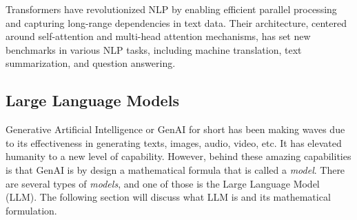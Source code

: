 Transformers have revolutionized NLP by enabling efficient parallel processing and capturing long-range dependencies in text data. Their architecture, centered around self-attention and multi-head attention mechanisms, has set new benchmarks in various NLP tasks, including machine translation, text summarization, and question answering.

\subsection{Large Language Models}\label{sec:llm_method}
Generative Artificial Intelligence or GenAI for short has been making waves due to its effectiveness in generating texts, images, audio, video, etc. It has elevated humanity to a new level of capability. However, behind these amazing capabilities is that GenAI is by design a mathematical formula that is called a \textit{model}. There are several types of \textit{models}, and one of those is the Large Language Model (LLM). The following section will discuss what LLM is and its mathematical formulation.


